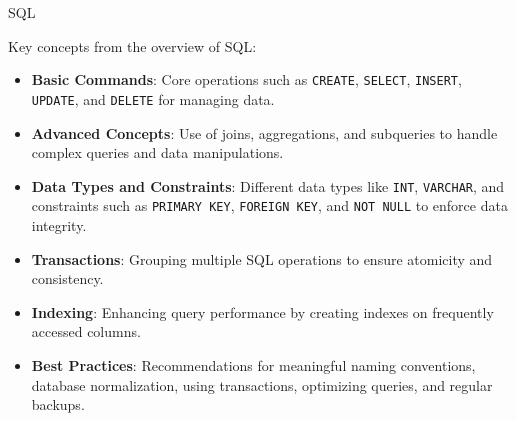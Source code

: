 \begin{notes}{SQL}
\begin{highlight}
    \end{highlight}

    \begin{highlight}

        Key concepts from the overview of SQL:
        
        \begin{itemize}
            \item \textbf{Basic Commands}: Core operations such as \texttt{CREATE}, \texttt{SELECT}, \texttt{INSERT}, \texttt{UPDATE}, and \texttt{DELETE} for managing data.
            \item \textbf{Advanced Concepts}: Use of joins, aggregations, and subqueries to handle complex queries and data manipulations.
            \item \textbf{Data Types and Constraints}: Different data types like \texttt{INT}, \texttt{VARCHAR}, and constraints such as \texttt{PRIMARY KEY}, \texttt{FOREIGN KEY}, and \texttt{NOT NULL} to enforce data integrity.
            \item \textbf{Transactions}: Grouping multiple SQL operations to ensure atomicity and consistency.
            \item \textbf{Indexing}: Enhancing query performance by creating indexes on frequently accessed columns.
            \item \textbf{Best Practices}: Recommendations for meaningful naming conventions, database normalization, using transactions, optimizing queries, and regular backups.
        \end{itemize}
        
    \end{highlight}
\end{notes}